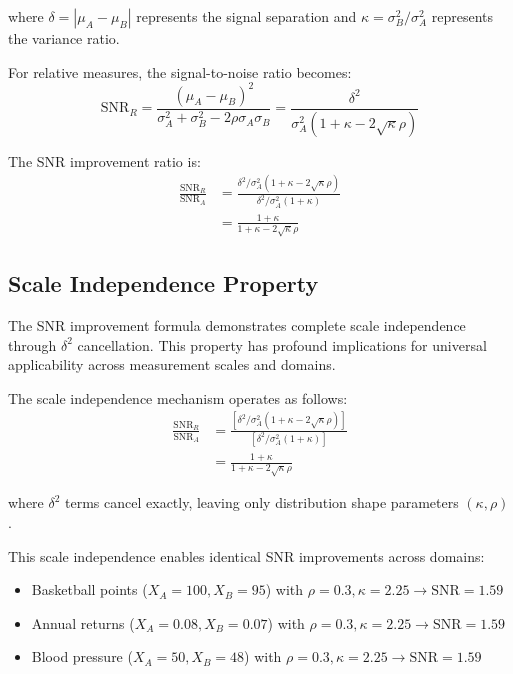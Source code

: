 where $\delta = |\mu_A - \mu_B|$ represents the signal separation and $\kappa = \sigma_B^2/\sigma_A^2$ represents the variance ratio.

For relative measures, the signal-to-noise ratio becomes:
\begin{equation}
\text{SNR}_R = \frac{(\mu_A - \mu_B)^2}{\sigma_A^2 + \sigma_B^2 - 2\rho\sigma_A\sigma_B} = \frac{\delta^2}{\sigma_A^2(1 + \kappa - 2\sqrt{\kappa}\rho)} \label{eq:relative_snr}
\end{equation}

The SNR improvement ratio is:
\begin{align}
\frac{\text{SNR}_R}{\text{SNR}_A} &= \frac{\delta^2/\sigma_A^2(1 + \kappa - 2\sqrt{\kappa}\rho)}{\delta^2/\sigma_A^2(1 + \kappa)} \nonumber \\
&= \frac{1 + \kappa}{1 + \kappa - 2\sqrt{\kappa}\rho} \label{eq:snr_improvement}
\end{align}

\subsection{Scale Independence Property}

The SNR improvement formula demonstrates complete scale independence through $\delta^2$ cancellation. This property has profound implications for universal applicability across measurement scales and domains.

The scale independence mechanism operates as follows:
\begin{align}
\frac{\text{SNR}_R}{\text{SNR}_A} &= \frac{[\delta^2/\sigma_A^2(1 + \kappa - 2\sqrt{\kappa}\rho)]}{[\delta^2/\sigma_A^2(1 + \kappa)]} \nonumber \\
&= \frac{1 + \kappa}{1 + \kappa - 2\sqrt{\kappa}\rho} \label{eq:scale_independence}
\end{align}

where $\delta^2$ terms cancel exactly, leaving only distribution shape parameters $(\kappa, \rho)$.

This scale independence enables identical SNR improvements across domains:
\begin{itemize}
    \item Basketball points ($X_A = 100, X_B = 95$) with $\rho = 0.3, \kappa = 2.25 \rightarrow \text{SNR} = 1.59$
    \item Annual returns ($X_A = 0.08, X_B = 0.07$) with $\rho = 0.3, \kappa = 2.25 \rightarrow \text{SNR} = 1.59$
    \item Blood pressure ($X_A = 50, X_B = 48$) with $\rho = 0.3, \kappa = 2.25 \rightarrow \text{SNR} = 1.59$
\end{itemize}

